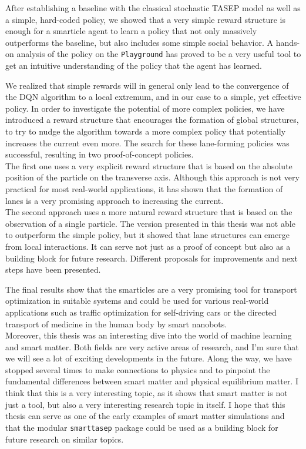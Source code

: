 After establishing a baseline with the classical stochastic TASEP model as well as a simple, hard-coded policy, we showed that a very simple reward structure is enough for a smarticle agent to learn a policy that not only massively outperforms the baseline, but also includes some simple social behavior. A hands-on analysis of the policy on the \texttt{Playground} has proved to be a very useful tool to get an intuitive understanding of the policy that the agent has learned.


We realized that simple rewards will in general only lead to the convergence of the DQN algorithm to a local extremum, and in our case to a simple, yet effective policy. In order to investigate the potential of more complex policies, we have introduced a reward structure that encourages the formation of global structures, to try to nudge the algorithm towards a more complex policy that potentially increases the current even more. The search for these lane-forming policies was successful, resulting in two proof-of-concept policies. 
\\
The first one uses a very explicit reward structure that is based on the absolute position of the particle on the transverse axis. Although this approach is not very practical for most real-world applications, it has shown that the formation of lanes is a very promising approach to increasing the current. 
\\
The second approach uses a more natural reward structure that is based on the observation of a single particle. The version presented in this thesis was not able to outperform the simple policy, but it showed that lane structures can emerge from local interactions. It can serve not just as a proof of concept but also as a building block for future research. Different proposals for improvements and next steps have been presented. 


The final results show that the smarticles are a very promising tool for transport optimization in suitable systems and could be used for various real-world applications such as traffic optimization for self-driving cars or the directed transport of medicine in the human body by smart nanobots. 
\\
Moreover, this thesis was an interesting dive into the world of machine learning and smart matter. Both fields are very active areas of research, and I'm sure that we will see a lot of exciting developments in the future. Along the way, we have stopped several times to make connections to physics and to pinpoint the fundamental differences between smart matter and physical equilibrium matter. I think that this is a very interesting topic, as it shows that smart matter is not just a tool, but also a very interesting research topic in itself. I hope that this thesis can serve as one of the early examples of smart matter simulations and that the modular \texttt{smarttasep} package could be used as a building block for future research on similar topics. 

